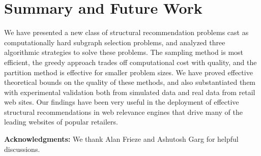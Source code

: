 \vspace{-0.1in}
\section{Summary and Future Work}
We have presented a new class of structural recommendation problems
cast as computationally hard subgraph selection problems, and analyzed three algorithmic
strategies to solve these problems.
The sampling method is most
efficient, the greedy approach trades off computational cost with
quality, and the partition method is effective for smaller problem
sizes. We have proved effective theoretical bounds on the quality
of these methods, and also substantiated them with experimental
validation both from simulated data and real data from
retail web sites. Our findings have been very useful in the
deployment of effective structural recommendations in web relevance
engines that drive many of the leading websites of popular retailers. \vs

\iffalse
Our sampling method and its analysis extends to more general
models of random graphs: in one version, we can consider
hierarchical models that take into account the product hierarchy
trees under which the pages in $L$ and $R$ are situated. A second
version considers a Cartesian product model where the pages in $L$
and $R$ are partitioned into closely related blocks and the graph
induced between every pair of left-right blocks follows a fixed
degree random model. A third variant models the potential flow of
customer traffic over each possible recommended edge from a left to
right page with nonnegative weights, and the resulting problem is
to find a subgraph where the number of right nodes with at least a
certain minimum amount of recommended traffic. Validating these
more general models by fitting real life data to them as well as
corroborating the performance of various methods in simulated and
real data for these models could yield an even better understanding
of our suggested algorithmic strategies for the
recommendation subgraph problem.\vs
\fi

{\bf Acknowledgments:} We thank Alan Frieze and Ashutosh Garg for helpful
discussions.

\vspace{-.05in} 